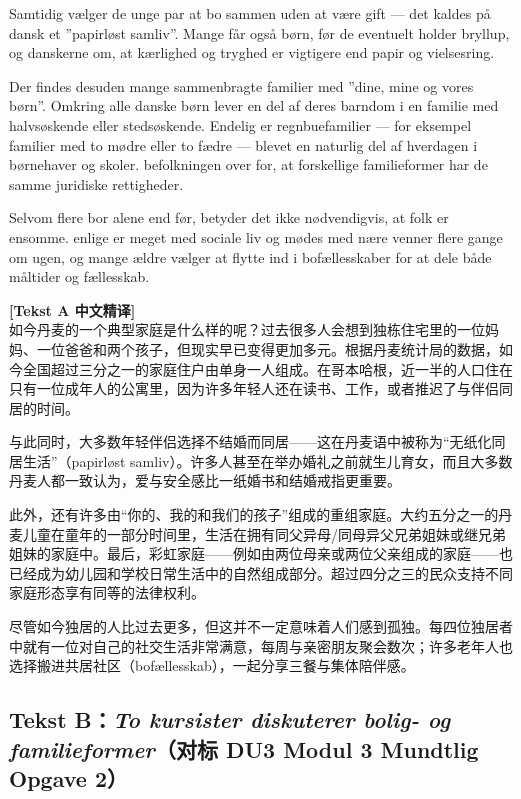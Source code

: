 Samtidig vælger  de unge par at bo sammen uden at være gift --- det kaldes på dansk et ”papirløst samliv”. Mange får også børn, før de eventuelt holder bryllup, og  danskerne  om, at kærlighed og tryghed er vigtigere end papir og vielsesring.

Der findes desuden mange sammenbragte familier med ”dine, mine og vores børn”. Omkring  alle danske børn lever en del af deres barndom i en familie med halvsøskende eller stedsøskende. Endelig er regnbuefamilier --- for eksempel familier med to mødre eller to fædre --- blevet en naturlig del af hverdagen i børnehaver og skoler.  befolkningen  over for, at forskellige familieformer har de samme juridiske rettigheder.

Selvom flere bor alene end før, betyder det ikke nødvendigvis, at folk er ensomme.  enlige er meget  med  sociale liv og mødes med nære venner flere gange om ugen, og mange ældre vælger at flytte ind i bofællesskaber for at dele både måltider og fællesskab.

\begin{transbox}
\small
\textbf{\color{NCDTeal}[Tekst A 中文精译]}\\
如今丹麦的一个典型家庭是什么样的呢？过去很多人会想到独栋住宅里的一位妈妈、一位爸爸和两个孩子，但现实早已变得更加多元。根据丹麦统计局的数据，如今全国超过三分之一的家庭住户由单身一人组成。在哥本哈根，近一半的人口住在只有一位成年人的公寓里，因为许多年轻人还在读书、工作，或者推迟了与伴侣同居的时间。

与此同时，大多数年轻伴侣选择不结婚而同居——这在丹麦语中被称为“无纸化同居生活”（papirløst samliv）。许多人甚至在举办婚礼之前就生儿育女，而且大多数丹麦人都一致认为，爱与安全感比一纸婚书和结婚戒指更重要。

此外，还有许多由“你的、我的和我们的孩子”组成的重组家庭。大约五分之一的丹麦儿童在童年的一部分时间里，生活在拥有同父异母/同母异父兄弟姐妹或继兄弟姐妹的家庭中。最后，彩虹家庭——例如由两位母亲或两位父亲组成的家庭——也已经成为幼儿园和学校日常生活中的自然组成部分。超过四分之三的民众支持不同家庭形态享有同等的法律权利。

尽管如今独居的人比过去更多，但这并不一定意味着人们感到孤独。每四位独居者中就有一位对自己的社交生活非常满意，每周与亲密朋友聚会数次；许多老年人也选择搬进共居社区（bofællesskab），一起分享三餐与集体陪伴感。
\end{transbox}

\subsection*{Tekst B：\textit{To kursister diskuterer bolig- og familieformer}（对标 DU3 Modul 3 Mundtlig Opgave 2）}


